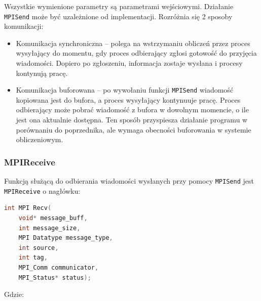 Wszystkie wymienione parametry są parametrami wejściowymi. Działanie \texttt{MPI\textunderscore Send} może być uzależnione od implementacji. Rozróżnia się 2 sposoby komunikacji:

\begin{itemize}
	\item Komunikacja synchroniczna -- polega na wstrzymaniu obliczeń przez proces wysyłający do momentu, gdy proces odbierający zgłosi gotowość do przyjęcia wiadomości. Dopiero po zgłoszeniu, informacja zostaje wysłana i procesy kontynują pracę.
	\item Komunikacja buforowana -- po wywołaniu funkcji \texttt{MPI\textunderscore Send} wiadomość kopiowana jest do bufora, a proces wysyłający kontynuuje pracę. Proces odbierający może pobrać wiadomość z bufora w dowolnym momencie, o ile jest ona aktualnie dostępna. Ten sposób przyspiesza działanie programu w porównaniu do poprzednika, ale wymaga obecności buforowania w systemie obliczeniowym.
\end{itemize}

\subsubsection{MPI\textunderscore Receive}
Funkcją służącą do odbierania wiadomości wysłanych przy pomocy \texttt{MPI\textunderscore Send} jest \texttt{MPI\textunderscore Receive} o nagłówku:
\begin{lstlisting}[language=C]
int MPI Recv(
	void* message_buff,
	int message_size,
	MPI Datatype message_type,
	int source,
	int tag,
	MPI_Comm communicator,
	MPI_Status* status);
\end{lstlisting}

Gdzie:

